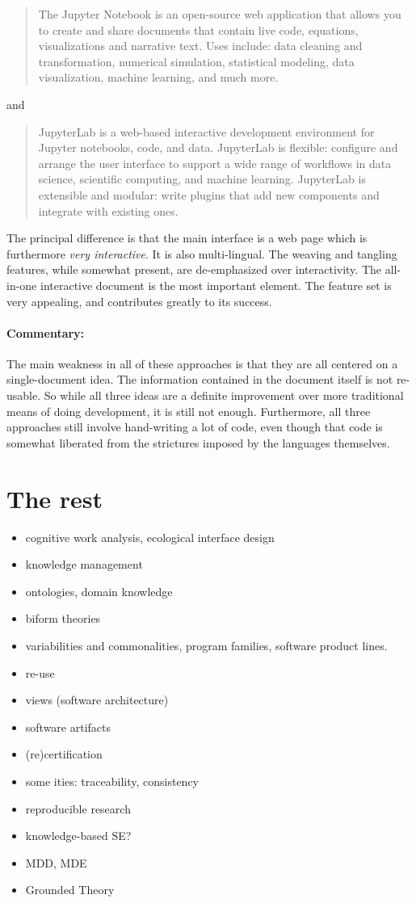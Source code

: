 \documentclass[10pt,twoside,onecolumn,openany,letterpaper]{memoir}
\begin{document}
\begin{quote}
The Jupyter Notebook is an open-source web application that allows you to
create and share documents that contain live code, equations, visualizations
and narrative text. Uses include: data cleaning and transformation, numerical
simulation, statistical modeling, data visualization, machine learning, and
much more.
\end{quote}
\noindent and
\begin{quote}
JupyterLab is a web-based interactive development environment for Jupyter
notebooks, code, and data. JupyterLab is flexible: configure and arrange the
user interface to support a wide range of workflows in data science, scientific
computing, and machine learning. JupyterLab is extensible and modular: write
plugins that add new components and integrate with existing ones.
\end{quote}
The principal difference is that the main interface is a web page
which is furthermore \emph{very interactive}. It is also multi-lingual.
The weaving and tangling features, while somewhat present, are de-emphasized
over interactivity. The all-in-one interactive document is the most
important element.  The feature set is very appealing, and contributes greatly
to its success.

\paragraph{Commentary:} The main weakness in all of these approaches is
that they are all centered on a single-document idea. The information
contained in the document itself is not re-usable. So while all three
ideas are a definite improvement over more traditional means of doing
development, it is still not enough. Furthermore, all three approaches
still involve hand-writing a lot of code, even though that code is
somewhat liberated from the strictures imposed by the languages themselves.

\section{The rest}
\begin{itemize}
\item cognitive work analysis, ecological interface design
\item knowledge management
\item ontologies, domain knowledge
\item biform theories
\item variabilities and commonalities, program families,
software product lines.
\item re-use
\item views (software architecture)
\item software artifacts
\item (re)certification
\item some ities: traceability, consistency
\item reproducible research
\item knowledge-based SE?
\item MDD, MDE
\item Grounded Theory
\end{itemize}
\end{document}
